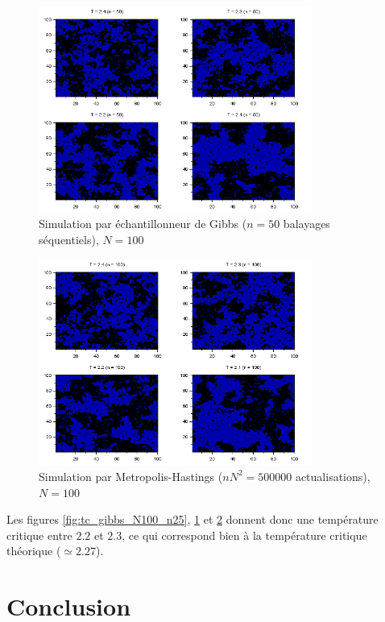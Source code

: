 \documentclass[a4paper,11pt]{article}
\begin{document}
\begin{figure}[!htbp]
	\centering
	\includegraphics[width=0.8\textwidth]{temperature_critique_gibbs_N100_n50.png}
	\caption{Simulation par échantillonneur de Gibbs ($n = 50$ balayages séquentiels), $N = 100$}
	\label{fig:tc_gibbs_N100_n50}
\end{figure}
\begin{figure}[!htbp]
	\centering
	\includegraphics[width=0.8\textwidth]{temperature_critique_MH_N100_n100.png}
	\caption{Simulation par Metropolis-Hastings ($nN^2 = 500000$ actualisations), $N = 100$}
	\label{fig:tc_MH_N100_n100}
\end{figure}
Les figures \ref{fig:tc_gibbs_N100_n25}, \ref{fig:tc_gibbs_N100_n50} et \ref{fig:tc_MH_N100_n100} donnent donc une température critique entre $2.2$ et $2.3$, ce qui correspond bien à la température critique théorique ($\simeq 2.27$).

\section{Conclusion}
\end{document}
